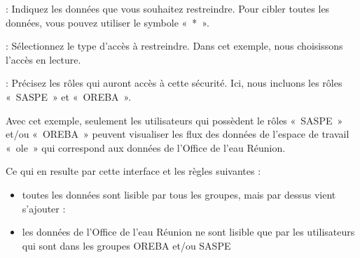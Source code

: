 \documentclass[letterpaper,10pt,french]{sphinxmanual}
\let\sphinxpxdimen\pdfpxdimen\else\newdimen\sphinxpxdimen
\begin{document}
\sphinxAtStartPar
{} : Indiquez les données que vous souhaitez restreindre. Pour cibler toutes les données, vous pouvez utiliser le symbole « * ».

\sphinxAtStartPar
{} : Sélectionnez le type d’accès à restreindre. Dans cet exemple, nous choisissons l’accès en lecture.

\sphinxAtStartPar
{} : Précisez les rôles qui auront accès à cette sécurité. Ici, nous incluons les rôles « SASPE » et « OREBA ».

\sphinxAtStartPar
Avec cet exemple, seulement les utilisateurs qui possèdent le rôles « SASPE » et/ou « OREBA » peuvent visualiser les flux des données de l’espace de travail « ole »
qui correspond aux données de l’Office de l’eau Réunion.

\sphinxAtStartPar
Ce qui en resulte par cette interface et les règles suivantes :
\begin{itemize}
\item {} 
\sphinxAtStartPar
toutes les données sont lisible par tous les groupes, mais par dessus vient s’ajouter :

\item {} 
\sphinxAtStartPar
les données de l’Office de l’eau Réunion ne sont lisible que par les utilisateurs qui sont dans les groupes OREBA et/ou SASPE

\end{itemize}

\noindent{\hspace*{\fill}\sphinxincludegraphics[width=700\sphinxpxdimen]{{geos_result}.png}\hspace*{\fill}}

\sphinxstepscope
\end{document}
